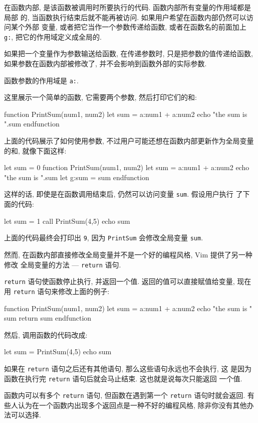 在函数内部, 是该函数被调用时所要执行的代码. 函数内部所有变量的作用域都是局部
的, 当函数执行结束后就不能再被访问. 如果用户希望在函数内部仍然可以访问某个外部
变量, 或者把它当作一个参数传递给函数, 或者在函数名的前面加上 \texttt{g:},
把它的作用域定义成全局的.
\begin{warning}
    如果把一个变量作为参数输送给函数, 在传递参数时, 只是把参数的值传递给函数,
    如果参数在函数内部被修改了, 并不会影响到函数外部的实际参数.
\end{warning}

函数参数的作用域是 \texttt{a:}.

这里展示一个简单的函数, 它需要两个参数, 然后打印它们的和:
\begin{vimcode}
function PrintSum(num1, num2)
    let sum = a:num1 + a:num2
    echo "the sum is ".sum
endfunction
\end{vimcode}
上面的代码展示了如何使用参数, 不过用户可能还想在函数内部更新作为全局变量的和,
就像下面这样:
\begin{vimcode}
let sum = 0
function PrintSum(num1, num2)
    let sum = a:num1 + a:num2
    echo "the sum is ".sum
    let g:sum = sum
endfunction
\end{vimcode}
这样的话, 即使是在函数调用结束后, 仍然可以访问变量 \texttt{sum}. 假设用户执行
了下面的代码:
\begin{vimcode}
let sum = 1
call PrintSum(4,5)
echo sum
\end{vimcode}
上面的代码最终会打印出 \texttt{9}, 因为 \texttt{PrintSum} 会修改全局变量
\texttt{sum}.

然而, 在函数内部直接修改全局变量并不是一个好的编程风格, Vim 提供了另一种修改
全局变量的方法 --- \texttt{return} 语句.

\texttt{return} 语句使函数停止执行, 并返回一个值. 返回的值可以直接赋值给变量,
现在用 \texttt{return} 语句来修改上面的例子:
\begin{vimcode}
function PrintSum(num1, num2)
    let sum = a:num1 + a:num2
    echo "the sum is " sum
    return sum
endfunction
\end{vimcode}
然后, 调用函数的代码改成:
\begin{vimcode}
let sum = PrintSum(4,5)
echo sum
\end{vimcode}

如果在 \texttt{return} 语句之后还有其他语句, 那么这些语句永远也不会执行, 这
是因为函数在执行完 \texttt{return} 语句后就会马止结束. 这也就是说每次只能返回
一个值.

\begin{warning}
    函数内可以有多个 \texttt{return} 语句, 但函数在遇到第一个 \texttt{return}
    语句时就会返回. 有些人认为在一个函数内出现多个返回点是一种不好的编程风格,
    除非你没有其他办法可以选择.
\end{warning}

